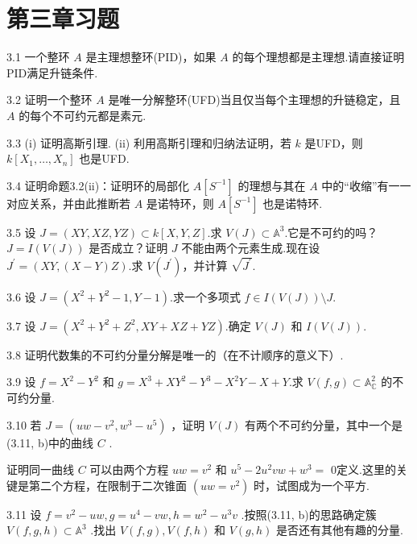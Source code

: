 \section{第三章习题}

3.1 一个整环 \(A\) 是主理想整环(PID)，如果 \(A\) 的每个理想都是主理想.请直接证明PID满足升链条件.

3.2 证明一个整环 \(A\) 是唯一分解整环(UFD)当且仅当每个主理想的升链稳定，且 \(A\) 的每个不可约元都是素元.

3.3 (i) 证明高斯引理. (ii) 利用高斯引理和归纳法证明，若 \(k\) 是UFD，则 \(k\left\lbrack  {{X}_{1},\ldots ,{X}_{n}}\right\rbrack\) 也是UFD.

3.4 证明命题3.2(ii)：证明环的局部化 \(A[S^{-1}]\) 的理想与其在 \(A\) 中的“收缩”有一一对应关系，并由此推断若 \(A\) 是诺特环，则 \(A[S^{-1}]\) 也是诺特环.

3.5 设 \(J = \left( {{XY},{XZ},{YZ}}\right)  \subset  k\left\lbrack  {X,Y,Z}\right\rbrack\).求 \(V\left( J\right)  \subset  {\mathbb{A}}^{3}\).它是不可约的吗？\(J = I\left( {V\left( J\right) }\right)\) 是否成立？证明 \(J\) 不能由两个元素生成.现在设 \({J}^{\prime } = \left( {{XY},\left( {X - Y}\right) Z}\right)\).求 \(V\left( {J}^{\prime }\right)\)，并计算 \(\sqrt{J^{\prime}}\).

3.6 设 \(J = \left( {{X}^{2} + {Y}^{2} - 1,Y - 1}\right)\).求一个多项式 \(f \in  I\left( {V\left( J\right) }\right)  \setminus  J\).

3.7 设 \(J = \left( {{X}^{2} + {Y}^{2} + {Z}^{2},{XY} + {XZ} + {YZ}}\right)\).确定 \(V\left( J\right)\) 和 \(I\left( {V\left( J\right) }\right)\).

3.8 证明代数集的不可约分量分解是唯一的（在不计顺序的意义下）.

3.9 设 \(f = {X}^{2} - {Y}^{2}\) 和 \(g = {X}^{3} + X{Y}^{2} - {Y}^{3} - {X}^{2}Y - X + Y\).求 \(V\left( {f,g}\right)  \subset  {\mathbb{A}}_{\mathbb{C}}^{2}\) 的不可约分量.

3.10 若 \(J = \left( {{uw} - {v}^{2},{w}^{3} - {u}^{5}}\right)\) ，证明 \(V\left( J\right)\) 有两个不可约分量，其中一个是(3.11, b)中的曲线 \(C\) .

证明同一曲线 \(C\) 可以由两个方程 \({uw} = {v}^{2}\) 和 \({u}^{5} - 2{u}^{2}{vw} + {w}^{3} =\) 0定义.这里的关键是第二个方程，在限制于二次锥面 \(\left( {{uw} = {v}^{2}}\right)\) 时，试图成为一个平方.

3.11 设 \(f = {v}^{2} - {uw},g = {u}^{4} - {vw},h = {w}^{2} - {u}^{3}v\) .按照(3.11, b)的思路确定簇 \(V\left( {f,g,h}\right)  \subset  {\mathbb{A}}^{3}\) .找出 \(V\left( {f,g}\right) ,V\left( {f,h}\right)\) 和 \(V\left( {g,h}\right)\) 是否还有其他有趣的分量.

